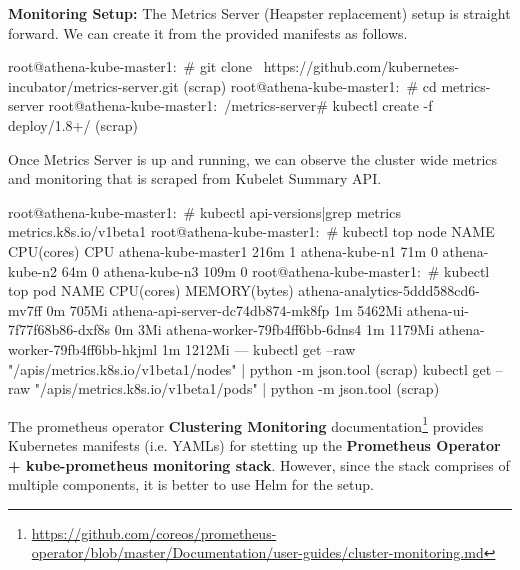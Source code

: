 \noindent \textbf{Monitoring Setup:} \quad The Metrics Server (Heapster replacement) setup is straight forward. We can create it from the provided manifests as follows.

\begin{small}
\begin{lcverbatim}
root@athena-kube-master1:~# git clone \
		https://github.com/kubernetes-incubator/metrics-server.git
(scrap)
root@athena-kube-master1:~# cd metrics-server
root@athena-kube-master1:~/metrics-server# kubectl create -f deploy/1.8+/
(scrap)
\end{lcverbatim}
\end{small}

Once Metrics Server is up and running, we can observe the cluster wide metrics and monitoring that is scraped from Kubelet Summary API.

\begin{small}
\begin{lcverbatim}
root@athena-kube-master1:~# kubectl api-versions|grep metrics
metrics.k8s.io/v1beta1
root@athena-kube-master1:~# kubectl top node
NAME                  CPU(cores)   CPU%
athena-kube-master1   216m         1%
athena-kube-n1        71m          0%
athena-kube-n2        64m          0%
athena-kube-n3        109m         0%
root@athena-kube-master1:~# kubectl top pod
NAME                                CPU(cores)   MEMORY(bytes)
athena-analytics-5ddd588cd6-mv7ff   0m           705Mi
athena-api-server-dc74db874-mk8fp   1m           5462Mi
athena-ui-7f77f68b86-dxf8s          0m           3Mi
athena-worker-79fb4ff6bb-6dns4      1m           1179Mi
athena-worker-79fb4ff6bb-hkjml      1m           1212Mi
---
kubectl get --raw "/apis/metrics.k8s.io/v1beta1/nodes" | python -m json.tool
(scrap)
kubectl get --raw "/apis/metrics.k8s.io/v1beta1/pods" | python -m json.tool
(scrap)
\end{lcverbatim}
\end{small}

The prometheus operator \textbf{Clustering Monitoring} documentation\footnote{\url{https://github.com/coreos/prometheus-operator/blob/master/Documentation/user-guides/cluster-monitoring.md}} provides Kubernetes manifests (i.e. YAMLs) for stetting up the \textbf{Prometheus Operator + kube-prometheus monitoring stack}. However, since the stack comprises of multiple components, it is better to use Helm for the setup.  

